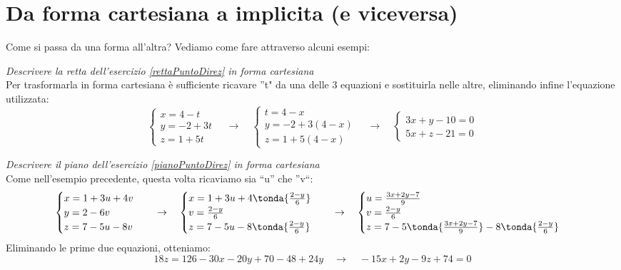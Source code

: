 \section{Da forma cartesiana a implicita (e viceversa)}
Come si passa da una forma all'altra? Vediamo come fare attraverso alcuni esempi:
\begin{esempio}
\emph{Descrivere la retta dell'esercizio \ref{rettaPuntoDirez} in forma cartesiana}\\[5pt]
Per trasformarla in forma cartesiana è sufficiente ricavare ''t" da una delle 3 equazioni e sostituirla nelle altre, eliminando infine l'equazione utilizzata:
\[\begin{cases}
x = 4-t \\
y = -2+3t \\
z = 1+5t
\end{cases} \quad \rightarrow \quad \begin{cases}
t = 4-x \\
y = -2+3(4-x) \\
z = 1+5(4-x)
\end{cases} \quad \rightarrow \quad \begin{cases}
3x+y-10 = 0 \\
5x+z-21 = 0
\end{cases} \]
\end{esempio}
\begin{esempio}
\emph{Descrivere il piano dell'esercizio \ref{pianoPuntoDirez} in forma cartesiana}\\[5pt]
Come nell'esempio precedente, questa volta ricaviamo sia ``u'' che ''v``:
\[\begin{cases}
x = 1+3u+4v \\
y = 2-6v \\
z = 7-5u-8v
\end{cases} \quad \rightarrow \quad \begin{cases}
x = 1+3u+4 \tonda{\frac{2-y}{6}} \\
v = \frac{2-y}{6} \\
z = 7-5u-8\tonda{\frac{2-y}{6}}
\end{cases} \quad \rightarrow \quad \begin{cases}
u = \frac{3x+2y-7}{9} \\
v = \frac{2-y}{6} \\
z = 7-5 \tonda{\frac{3x+2y-7}{9}}-8\tonda{\frac{2-y}{6}}
\end{cases} \]
Eliminando le prime due equazioni, otteniamo:
\[18z=126-30x-20y+70-48+24y \quad \rightarrow \quad -15x+2y-9z+74=0\]
\end{esempio}
